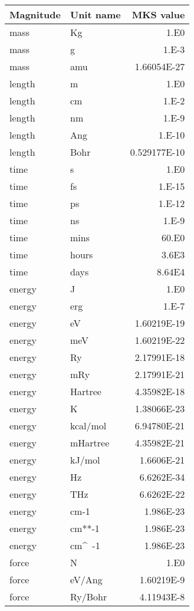 \begin{center}
\begin{tabular}{llr}
Magnitude & Unit name & MKS value \\
\hline
mass     & Kg         & 1.E0 \\
mass     & g          & 1.E-3 \\
mass     & amu        & 1.66054E-27 \\
length   & m          & 1.E0 \\
length   & cm         & 1.E-2 \\
length   & nm         & 1.E-9 \\
length   & Ang        & 1.E-10 \\
length   & Bohr       & 0.529177E-10 \\
time     & s          & 1.E0 \\
time     & fs         & 1.E-15 \\
time     & ps         & 1.E-12 \\
time     & ns         & 1.E-9 \\
time     & mins       & 60.E0 \\
time     & hours      & 3.6E3 \\
time     & days       & 8.64E4 \\
energy   & J          & 1.E0 \\
energy   & erg        & 1.E-7 \\
energy   & eV         & 1.60219E-19 \\
energy   & meV        & 1.60219E-22 \\
energy   & Ry         & 2.17991E-18 \\
energy   & mRy        & 2.17991E-21 \\
energy   & Hartree    & 4.35982E-18 \\
energy   & K          & 1.38066E-23 \\
energy   & kcal/mol   & 6.94780E-21 \\
energy   & mHartree   & 4.35982E-21 \\
energy   & kJ/mol     & 1.6606E-21 \\
energy   & Hz         & 6.6262E-34 \\
energy   & THz        & 6.6262E-22 \\
energy   & cm-1       & 1.986E-23 \\
energy   & cm**-1     & 1.986E-23 \\
energy   & cm\^~-1      & 1.986E-23 \\
force    & N          & 1.E0 \\
force    & eV/Ang     & 1.60219E-9 \\
force    & Ry/Bohr    & 4.11943E-8 \\
\hline
\end{tabular}


\end{center}
